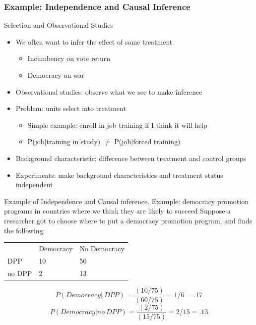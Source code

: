 \documentclass{beamer}
\numberwithin{equation}{section}
\begin{document}
\begin{frame}
\frametitle{Example: Independence and Causal Inference} 

Selection and Observational Studies
\begin{itemize}
\item[-] We often want to infer the effect of some treatment 
\begin{itemize}
\item[-] Incumbency on vote return 
\item[-] Democracy on war
\end{itemize}
\item[-] Observational studies: observe what we see to make inference 
\item[-] Problem: units select into treatment 
\begin{itemize}
\item[-] Simple example: enroll in job training if I think it will help 
\item[-] P(job$|$training in study) $\neq$ P(job$|$forced training) 
\end{itemize}
\item[-] \alert{Background characteristic}: difference between
  treatment and control groups
\item[-] \alert{Experiments}: make background characteristics and treatment status
  independent 
\end{itemize}


\end{frame}

\begin{frame}{Example of Independence and Causal inference.}
Example: democracy promotion programs in countries where we think they are likely to succeed\pause
Suppose a researcher got to choose where to put a democracy promotion program, and finds the following:
\begin{table}
\begin{tabular}{lll}
		&Democracy& No Democracy\\
DPP &10 & 50\\
no DPP & 2& 13\\

\end{tabular}
\end{table}
\pause
$$P(Democracy|\ DPP)= \frac{(10/75)}{(60/75)} =1/6= .17$$
$$P(Democracy| no\ DPP)=  \frac{(2 /75)}{(15/75)} = 2/15=.13$$

 \end{frame}
\end{document}
